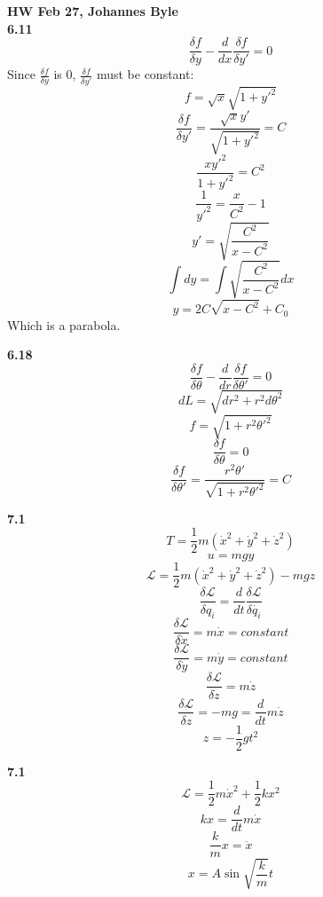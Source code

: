 \documentclass[english]{article}
\begin{document}
\begin{multicols*}{2}
\textbf{HW Feb 27, Johannes Byle}\\
\newcommand{\Lagr}{\mathcal{L}}
\noindent
\textbf{6.11} $$\frac{\delta f}{\delta y}-\frac{d}{dx}\frac{\delta f}{\delta y'}=0$$
Since $\frac{\delta f}{\delta y}$ is $0$, $\frac{\delta f}{\delta y'}$ must be constant:
$$f=\sqrt{x}\sqrt{1+y'^2}$$
$$\frac{\delta f}{\delta y'}=\frac{\sqrt{x}y'}{\sqrt{1+y'^2}}=C$$
$$\frac{xy'^2}{1+y'^2}=C^2$$
$$\frac{1}{y'^2}=\frac{x}{C^2}-1$$
$$y'=\sqrt{\frac{C^2}{x-C^2}}$$
$$\int dy=\int \sqrt{\frac{C^2}{x-C^2}} dx$$
$$y=2C\sqrt{x-C^2}+C_0$$
Which is a parabola.

\noindent
\textbf{6.18} $$\frac{\delta f}{\delta \theta}-\frac{d}{dr}\frac{\delta f}{\delta \theta'}=0$$
$$dL=\sqrt{dr^2+r^2d\theta^2}$$
$$f=\sqrt{1+r^2\theta'^2}$$
$$\frac{\delta f}{\delta \theta}=0$$
$$\frac{\delta f}{\delta \theta'}=\frac{r^2\theta'}{\sqrt{1+r^2\theta'^2}}=C$$

\noindent
\textbf{7.1} $$T=\frac{1}{2}m(\dot{x}^2+\dot{y}^2+\dot{z}^2)$$
$$u=mgy$$
$$\Lagr=\frac{1}{2}m(\dot{x}^2+\dot{y}^2+\dot{z}^2)-mgz$$
$$\frac{\delta\Lagr}{\delta q_i}=\frac{d}{dt}\frac{\delta\Lagr}{\delta\dot{q_i}}$$
$$\frac{\delta\Lagr}{\delta\dot{x}}=m\dot{x}=constant$$
$$\frac{\delta\Lagr}{\delta\dot{y}}=m\dot{y}=constant$$
$$\frac{\delta\Lagr}{\delta\dot{z}}=m\dot{z}$$
$$\frac{\delta\Lagr}{\delta z}=-mg=\frac{d}{dt}m\dot{z}$$
$$z=-\frac{1}{2}gt^2$$

\noindent
\textbf{7.1} $$\Lagr=\frac{1}{2}m\dot{x}^2+\frac{1}{2} kx^2$$
$$kx=\frac{d}{dt}m\dot{x}$$
$$\frac{k}{m}x=\ddot{x}$$
$$x=A\sin\sqrt{\frac{k}{m}}t$$
\end{multicols*}
\end{document}
